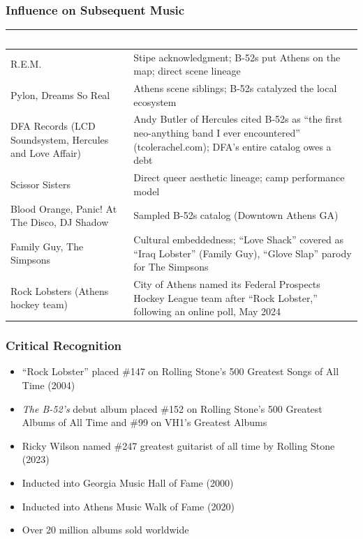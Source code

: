 \documentclass[11pt,letterpaper]{article}
\newcommand{\tableheader}[1]{\textbf{\sffamily\textcolor{white}{#1}}}
\begin{document}
\subsubsection{Influence on Subsequent Music}

\begin{center}
\begin{tabularx}{\textwidth}{L{3.5cm}X}
\toprule
{}
\tableheader{Artist / Scene} & \tableheader{Connection} \\
\midrule
R.E.M. & Stipe acknowledgment; B-52s put Athens on the map; direct scene lineage \\
Pylon, Dreams So Real & Athens scene siblings; B-52s catalyzed the local ecosystem \\
DFA Records (LCD Soundsystem, Hercules and Love Affair) & Andy Butler of Hercules cited B-52s as ``the first neo-anything band I ever encountered'' (tcolerachel.com); DFA's entire catalog owes a debt \\
Scissor Sisters & Direct queer aesthetic lineage; camp performance model \\
Blood Orange, Panic! At The Disco, DJ Shadow & Sampled B-52s catalog (Downtown Athens GA) \\
Family Guy, The Simpsons & Cultural embeddedness; ``Love Shack'' covered as ``Iraq Lobster'' (Family Guy), ``Glove Slap'' parody for The Simpsons \\
Rock Lobsters (Athens hockey team) & City of Athens named its Federal Prospects Hockey League team after ``Rock Lobster,'' following an online poll, May 2024 \\
\bottomrule
\end{tabularx}
\end{center}

\subsubsection{Critical Recognition}

\begin{itemize}[noitemsep]
  \item ``Rock Lobster'' placed \#147 on Rolling Stone's 500 Greatest Songs of All Time (2004)
  \item \textit{The B-52's} debut album placed \#152 on Rolling Stone's 500 Greatest Albums of All Time and \#99 on VH1's Greatest Albums
  \item Ricky Wilson named \#247 greatest guitarist of all time by Rolling Stone (2023)
  \item Inducted into Georgia Music Hall of Fame (2000)
  \item Inducted into Athens Music Walk of Fame (2020)
  \item Over 20 million albums sold worldwide
\end{itemize}
\end{document}
